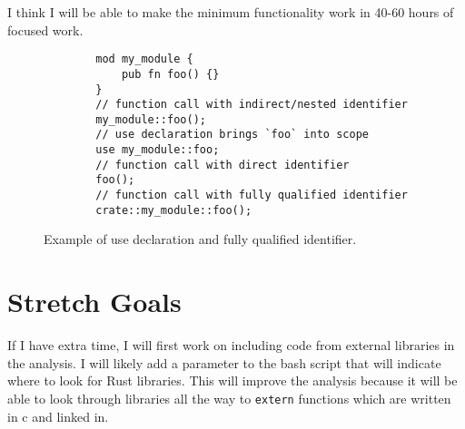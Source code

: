 \documentclass[11pt]{article}
\begin{document}

I think I will be able to make the minimum functionality work in 40-60 hours of focused work.





\begin{figure}
    \caption{Example of use declaration and fully qualified identifier.}
    \label{fig:qualifiers}
    \begin{lstlisting}
        mod my_module {
            pub fn foo() {}
        }
        // function call with indirect/nested identifier
        my_module::foo();
        // use declaration brings `foo` into scope
        use my_module::foo;
        // function call with direct identifier
        foo();
        // function call with fully qualified identifier
        crate::my_module::foo();
    \end{lstlisting}
\end{figure}

\section{Stretch Goals}
If I have extra time, I will first work on including code from external libraries in the analysis.
I will likely add a parameter to the bash script that will indicate where to look for Rust libraries.
This will improve the analysis because it will be able to look through libraries all the way to \lstinline{extern} functions which are written in c and linked in.
\end{document}

